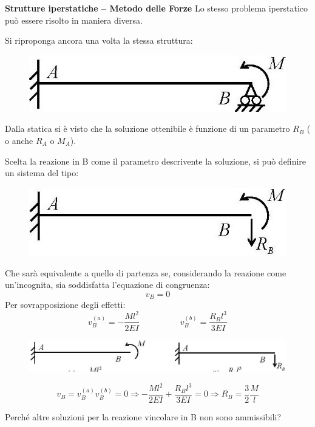 \documentclass{article}
\begin{document}
\begin{adjustwidth}{2in}{}
{\Large \textbf{Strutture iperstatiche – Metodo delle Forze}} \mbox{} \newline
 		Lo stesso problema iperstatico può essere risolto in maniera diversa. 
 		
 		Si riproponga ancora una volta la stessa struttura:
 		
\begin{figure}[H]
	\centering
	\includegraphics[width=0.4\linewidth]{"immagini/1.PARTE8_Pagina_42 (2)"}
\end{figure} 

		Dalla statica si è visto che la soluzione ottenibile è 
		 funzione di un parametro $ R_B $ (
		o anche $ R_A $ o $ M_A $).
		
		Scelta la reazione in B come il parametro descrivente la soluzione, si può definire un sistema del
		tipo:
 		
\begin{figure}[H]
	\centering
	\includegraphics[width=0.4\linewidth]{"immagini/1.PARTE8_Pagina_42 (3)"}
\end{figure}

		Che sarà equivalente a quello di partenza se, considerando la reazione come un’incognita, sia
		soddisfatta l’equazione di congruenza:
		\[v_B = 0\]
		Per sovrapposizione degli effetti:
		\[ v_B^{(a)} = -\dfrac{Ml^2}{2EI} \hspace{2cm} v_B^{(b)} = \dfrac{R_Bl^3}{3EI}  \]
		
\begin{figure}[H]
	\centering
	\includegraphics[width=0.7\linewidth]{"immagini/1.PARTE8_Pagina_42"}
\end{figure} 

		\[ v_B = v_B^{(a)}v_B^{(b)} = 0 \Rightarrow -\dfrac{Ml^2}{2EI} + \dfrac{R_Bl^3}{3EI} = 0 \Rightarrow R_B = \dfrac{3}{2}\dfrac{M}{l} \]
		
		Perché altre soluzioni per la reazione vincolare in B non sono ammissibili?
		

\end{adjustwidth}
\end{document}
